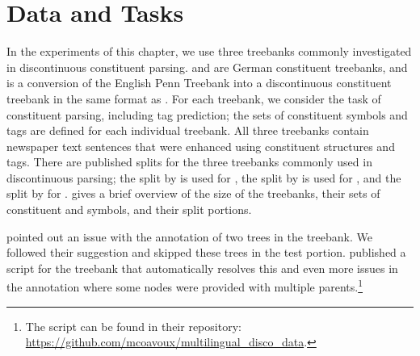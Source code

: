 \documentclass[../../document.tex]{subfiles}
\begin{document}
    \section{Data and Tasks}\label{sec:treebanks}
    In the experiments of this chapter, we use three treebanks commonly investigated in discontinuous constituent parsing.
     \citep{Skut98} and \tiger{} \citep{Brants04} are German constituent treebanks, and \dptb{} \citep{EvaKal11} is a conversion of the English Penn Treebank \citep{Marcus94} into a discontinuous constituent treebank in the same format as \negra{}.
    For each treebank, we consider the task of constituent parsing, including  tag prediction; the sets of constituent symbols and  tags are defined for each individual treebank.
    All three treebanks contain newspaper text sentences that were enhanced using constituent structures and  tags.
    There are published splits for the three treebanks commonly used in discontinuous parsing; the split by \citet{DubKel03} is used for \negra{}, the split by \citet{Sed13} is used for  \tiger{}, and the split by \citet{collins-1996-new} for \dptb{}.
     gives a brief overview of the size of the treebanks, their sets of constituent and  symbols, and their split portions.

     pointed out an issue with the annotation of two trees in the \tiger{} treebank.
    We followed their suggestion and skipped these trees in the test portion.
     published a script for the \tiger{} treebank that automatically resolves this and even more issues in the annotation where some nodes were provided with multiple parents.\footnote{The script can be found in their repository: \url{https://github.com/mcoavoux/multilingual_disco_data}.}
\end{document}
